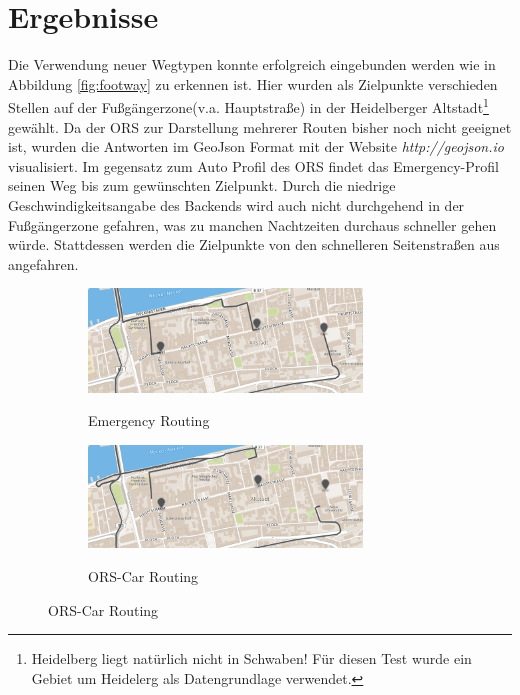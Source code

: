 \documentclass[12pt,a4paper]{article}
\begin{document}
\newpage
\newpage
\section{Ergebnisse}

Die Verwendung neuer Wegtypen konnte erfolgreich eingebunden werden wie in Abbildung \ref{fig:footway} zu erkennen ist. Hier wurden als Zielpunkte verschieden Stellen auf der Fußgängerzone(v.a. Hauptstraße) in der Heidelberger Altstadt\footnote{Heidelberg liegt natürlich nicht in Schwaben! Für diesen Test wurde ein Gebiet um Heidelerg als Datengrundlage verwendet.} gewählt. Da der ORS zur Darstellung mehrerer Routen bisher noch nicht geeignet ist, wurden die Antworten im GeoJson Format mit der Website \textit{http://geojson.io} visualisiert. Im gegensatz zum Auto Profil des ORS findet das Emergency-Profil seinen Weg bis zum gewünschten Zielpunkt. Durch die niedrige Geschwindigkeitsangabe des Backends wird auch nicht durchgehend in der Fußgängerzone gefahren, was zu manchen Nachtzeiten durchaus schneller gehen würde. Stattdessen werden die Zielpunkte von den schnelleren Seitenstraßen aus angefahren.

\begin{figure}[h]
\centering
\caption{Routing in die Fußgängerzone der Heidelberger Altstadt}
\label{fig:footway}
\begin{subfigure}{0.49\textwidth}
\centering
\includegraphics[width = 0.80\textwidth]{../media/Altstadt_emergency.png} \\
\caption{Emergency Routing}
\label{fig:alteme}
\end{subfigure}
\begin{subfigure}{0.49\textwidth}
\centering
\includegraphics[width = 0.80\textwidth]{../media/Altstadt_car.png} \\
\caption{ORS-Car Routing}
\label{fig:altcar}
\end{subfigure}
\end{figure}
\end{document}
